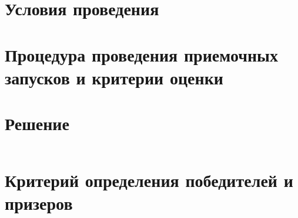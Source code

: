 \section{Условия проведения}


\section{Процедура проведения приемочных запусков и
критерии оценки}



\section{Решение}
\inputminted[fontsize=\footnotesize, linenos]{js}{final/command_tour/irs/solution.js}

\section{Критерий определения победителей и призеров}

